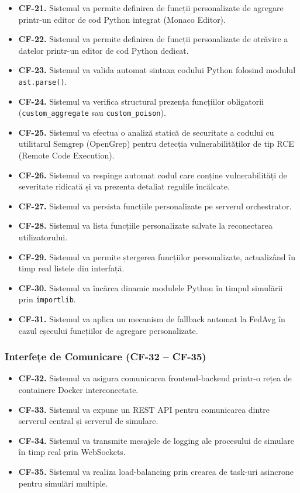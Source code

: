 \documentclass[../../main.tex]{subfiles}
\begin{document}
        \begin{itemize}
            \item \textbf{CF-21.} Sistemul va permite definirea de funcții personalizate de agregare printr-un editor de cod Python integrat (Monaco Editor).
            \item \textbf{CF-22.} Sistemul va permite definirea de funcții personalizate de otrăvire a datelor printr-un editor de cod Python dedicat.
            \item \textbf{CF-23.} Sistemul va valida automat sintaxa codului Python folosind modulul \texttt{ast.parse()}.
            \item \textbf{CF-24.} Sistemul va verifica structural prezența funcțiilor obligatorii (\texttt{custom\-\_aggregate} sau \texttt{custom\_poison}).
            \item \textbf{CF-25.} Sistemul va efectua o analiză statică de securitate a codului cu utilitarul Semgrep (OpenGrep) pentru detecția vulnerabilităților de tip RCE (Remote Code Execution).
            \item \textbf{CF-26.} Sistemul va respinge automat codul care conține vulnerabilități de severitate ridicată și va prezenta detaliat regulile încălcate.
            \item \textbf{CF-27.} Sistemul va persista funcțiile personalizate pe serverul orchestrator.
            \item \textbf{CF-28.} Sistemul va lista funcțiile personalizate salvate la reconectarea utilizatorului.
            \item \textbf{CF-29.} Sistemul va permite ștergerea funcțiilor personalizate, actualizând în timp real listele din interfață.
            \item \textbf{CF-30.} Sistemul va încărca dinamic modulele Python în timpul simulării prin \texttt{importlib}.
            \item \textbf{CF-31.} Sistemul va aplica un mecanism de fallback automat la FedAvg în cazul eșecului funcțiilor de agregare personalizate.
        \end{itemize}

        \subsubsection{Interfețe de Comunicare (CF-32 -- CF-35)}

        \begin{itemize}
            \item \textbf{CF-32.} Sistemul va asigura comunicarea frontend-backend printr-o rețea de containere Docker interconectate.
            \item \textbf{CF-33.} Sistemul va expune un REST API pentru comunicarea dintre serverul central și serverul de simulare.
            \item \textbf{CF-34.} Sistemul va transmite mesajele de logging ale procesului de simulare în timp real prin WebSockets.
            \item \textbf{CF-35.} Sistemul va realiza load-balancing prin crearea de task-uri asincrone pentru simulări multiple.
        \end{itemize}
\end{document}
